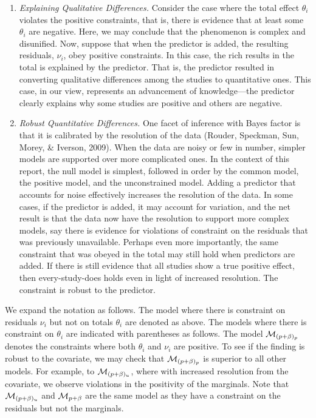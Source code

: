 \documentclass[english,,man]{apa6}
\begin{document}
\begin{enumerate}
\def\labelenumi{\roman{enumi}.}
\item
  \emph{Explaining Qualitative Differences.} Consider the case where the total effect \(\theta_i\) violates the positive constraints, that is, there is evidence that at least some \(\theta_i\) are negative. Here, we may conclude that the phenomenon is complex and disunified. Now, suppose that when the predictor is added, the resulting residuals, \(\nu_i\), obey positive constraints. In this case, the rich results in the total is explained by the predictor. That is, the predictor resulted in converting qualitative differences among the studies to quantitative ones. This case, in our view, represents an advancement of knowledge---the predictor clearly explains why some studies are positive and others are negative.
\item
  \emph{Robust Quantitative Differences.} One facet of inference with Bayes factor is that it is calibrated by the resolution of the data (Rouder, Speckman, Sun, Morey, \& Iverson, 2009). When the data are noisy or few in number, simpler models are supported over more complicated ones. In the context of this report, the null model is simplest, followed in order by the common model, the positive model, and the unconstrained model. Adding a predictor that accounts for noise effectively increases the resolution of the data. In some cases, if the predictor is added, it may account for variation, and the net result is that the data now have the resolution to support more complex models, say there is evidence for violations of constraint on the residuals that was previously unavailable. Perhaps even more importantly, the same constraint that was obeyed in the total may still hold when predictors are added. If there is still evidence that all studies show a true positive effect, then every-study-does holds even in light of increased resolution. The constraint is robust to the predictor.
\end{enumerate}

We expand the notation as follows. The model where there is constraint on residuals \(\nu_i\) but not on totals \(\theta_i\) are denoted as above. The models where there is constraint on \(\theta_i\) are indicated with parentheses as follows. The model \({\cal M}_{(p+\beta)_p}\) denotes the constraints where both \(\theta_i\) and \(\nu_i\) are positive. To see if the finding is robust to the covariate, we may check that \({\cal M}_{(p+\beta)_p}\) is superior to all other models. For example, to \({\cal M}_{(p+\beta)_u}\), where with increased resolution from the covariate, we observe violations in the positivity of the marginals. Note that \({\cal M}_{(p+\beta)_u}\) and \({\cal M}_{p+\beta}\) are the same model as they have a constraint on the residuals but not the marginals.
\end{document}
